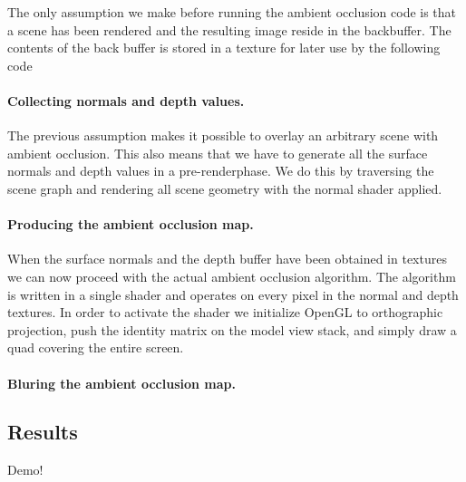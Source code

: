 The only assumption we make before running the ambient occlusion code
is that a scene has been rendered and the resulting image reside in
the backbuffer. The contents of the back buffer is stored in a texture
for later use by the following code

\paragraph{Collecting normals and depth values.}  
The previous assumption makes it possible to overlay an arbitrary
scene with ambient occlusion. This also means that we have to generate
all the surface normals and depth values in a pre-renderphase. We do
this by traversing the scene graph and rendering all scene geometry
with the normal shader applied.  

\paragraph{Producing the ambient occlusion map.}  
When the surface normals and the depth buffer have been obtained in
textures we can now proceed with the actual ambient occlusion
algorithm. The algorithm is written in a single shader and operates on
every pixel in the normal and depth textures. In order to activate the
shader we initialize OpenGL to orthographic projection, push the
identity matrix on the model view stack, and simply draw a quad
covering the entire screen.

\paragraph{Bluring the ambient occlusion map.}


\subsection{Results}
Demo!

